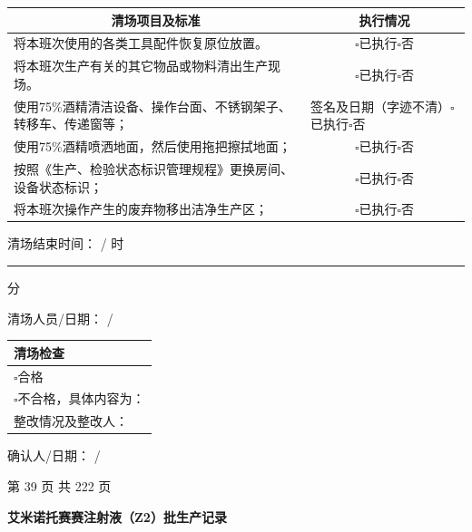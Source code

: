 \documentclass[UTF8,10pt,a4paper,fontset=fandol]{ctexart}
\newcommand{\fieldvalue}[1]{#1}
\newcommand{\handwritten}[1]{#1}
\begin{document}
\medskip
\noindent
\begin{tabularx}{\textwidth}{|X|c|}
\hline
\multicolumn{1}{|c|}{清场项目及标准} & \multicolumn{1}{c|}{执行情况} \\
\hline
将本班次使用的各类工具配件恢复原位放置。 &
$\square$已执行\quad $\square$否 \\
\hline
将本班次生产有关的其它物品或物料清出生产现场。 &
$\square$已执行\quad $\square$否 \\
\hline
使用75\%酒精清洁设备、操作台面、不锈钢架子、转移车、传递窗等；
&
\multicolumn{1}{|l|}{\hspace{1em}\handwritten{签名及日期（字迹不清）}\hfill $\square$已执行\quad $\square$否} \\
\hline
使用75\%酒精喷洒地面，然后使用拖把擦拭地面； &
$\square$已执行\quad $\square$否 \\
\hline
按照《生产、检验状态标识管理规程》更换房间、设备状态标识； &
$\square$已执行\quad $\square$否 \\
\hline
将本班次操作产生的废弃物移出洁净生产区； &
$\square$已执行\quad $\square$否 \\
\hline
\end{tabularx}

\medskip
\noindent
清场结束时间：
\fieldvalue{\handwritten{/}} 时 \rule{1.2em}{0.4pt} 分

\medskip
\noindent
清场人员/日期：
\fieldvalue{\handwritten{/}}

\medskip
\noindent
\begin{tabularx}{\textwidth}{|X|}
\hline
清场检查 \\
\hline
$\square$合格 \\
\hline
$\square$不合格，具体内容为： \\
\hline
整改情况及整改人： \\
\hline
\end{tabularx}

\medskip
\noindent
确认人/日期：
\fieldvalue{\handwritten{/}}

\begin{center}
第 39 页 共 222 页
\end{center}

\newpage

\begin{center}
\textbf{艾米诺托赛赛注射液（Z2）批生产记录}
\end{center}
\end{document}
